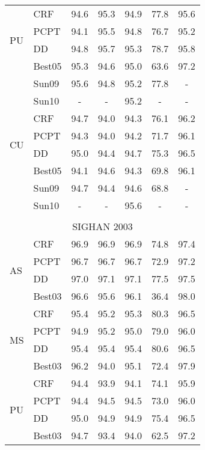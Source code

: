\begin{table}
\begin{small}
\begin{tabular}{ l | l | c | c | c | c | c   }
\multirow{4}{*}{PU} &   CRF        & 94.6 &	95.3 & 94.9  &   77.8 &  95.6 \\
& PCPT  & 94.1 & 95.5	& 94.8  &  76.7 &  95.2 \\
& DD  & 94.8 & {95.7} & {95.3}  &  {78.7} &95.8 \\
& Best05       & {95.3}  &      94.6 &  95.0   &  63.6 &  {97.2} \\
& Sun09      & 95.6   & 94.8  & 95.2  &   77.8  & - \\
& Sun10      & -   & -  & 95.2  &   -  & - \\
\hline

\multirow{4}{*}{CU}  & CRF       & 94.7 & 94.0 &  94.3  & {76.1} & 96.2 \\
& PCPT & 94.3 & 94.0 & 94.2  & 71.7  & 96.1  \\
& DD & {95.0} & 94.4 & {94.7}  & {75.3} & {96.5}  \\
& Best05      &  94.1 &  {94.6} & 94.3  & 69.8 & 96.1 \\
& Sun09      & 94.7   & 94.4  & 94.6  &   68.8  & - \\
& Sun10      & -   & -  & 95.6  &   -  & - \\
\hline

\multicolumn{7}{c}{} \\
\multicolumn{7}{c}{\large{SIGHAN 2003}} \\
\hline

\multirow{4}{*}{AS} & CRF    & 96.9 & 96.9 & 96.9  & 74.8 &  97.4 \\
& PCPT &  96.7 & 96.7 & 96.7  & 72.9  & 97.2 \\
& DD & {97.0} & {97.1} & {97.1}  & {77.5}  & 97.5 \\
 &  Best03     & 96.6     & 95.6 &  96.1  & 36.4 &  {98.0} \\
\hline
\multirow{4}{*}{MS}  & CRF     &  95.4 & 95.2 & 95.3  & 80.3	 & 96.5 \\
& PCPT &  94.9 & 95.2 & 95.0  & 79.0  & 96.0 \\
& DD &  95.4 & {95.4} & {95.4}	  & {80.6} & 96.5 \\
&  Best03        &   {96.2} &   94.0&  95.1  & 72.4 & {97.9} \\
\hline
\multirow{4}{*}{PU} & CRF       &  94.4 & 93.9 & 94.1   & 74.1   & 95.9 \\
& PCPT &  94.4 & 94.5 & 94.5   & 73.0  &  96.0 \\
& DD &  {95.0} & {94.9} & {94.9}  & {75.4} &  96.5 \\
&  Best03   &  94.7   & 93.4  & 94.0   &  62.5  &  {97.2} \\


\end{tabular}
\end{small}
\end{table}
